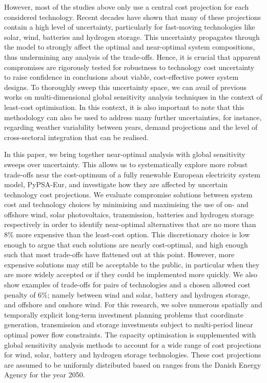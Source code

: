 However, most of the studies above only use a central cost projection for each
considered technology. Recent decades have shown that many of these projections
contain a high level of uncertainty, particularly for fast-moving technologies
like solar, wind, batteries and hydrogen storage.
\cite{ludererImpactDeclining2021,victoriaSolarPhotovoltaics2021,jaxa-rozenSourcesUncertainty2021}
This uncertainty propagates through the model to strongly affect the optimal and
near-optimal system compositions, thus undermining any analysis of the
trade-offs. Hence, it is crucial that apparent compromises are rigorously tested
for robustness to technology cost uncertainty to raise confidence in conclusions
about viable, cost-effective power system designs. To thoroughly sweep this
uncertainty space, we can avail of previous works on multi-dimensional global
sensitivity analysis techniques in the context of least-cost
optimisation.\cite{trondle_trade-offs_2020, mavromatidis_uncertainty_2018,
pizarro-alonso_uncertainties_2019, fais_impact_2016, usher_value_2015} In this
context, it is also important to note that this methodology can also be used to
address many further uncertainties, for instance, regarding weather variability
between years, demand projections and the level of cross-sectoral integration
that can be realised.


In this paper, we bring together near-optimal analysis with global sensitivity
sweeps over uncertainty. This allows us to systematically explore more robust
trade-offs near the cost-optimum of a fully renewable European electricity
system model, PyPSA-Eur,\cite{pypsaeur} and investigate how they are affected by
uncertain technology cost projections. We evaluate compromise solutions between
system cost and technology choices by minimising and maximising the use of on-
and offshore wind, solar photovoltaics, transmission, batteries and hydrogen
storage respectively in order to identify near-optimal alternatives that are no
more than 8\% more expensive than the least-cost option. This discretionary
choice is low enough to argue that such solutions are nearly cost-optimal, and
high enough such that most trade-offs have flattened out at this point. However,
more expensive solutions may still be acceptable to the public, in particular
when they are more widely accepted or if they could be implemented more quickly.
We also show examples of trade-offs for pairs of technologies and a chosen
allowed cost penalty of 6\%; namely between wind and solar, battery and hydrogen
storage, and offshore and onshore wind. For this research, we solve numerous
spatially and temporally explicit long-term investment planning problems that
coordinate generation, transmission and storage investments subject to
multi-period linear optimal power flow constraints. The capacity optimisation is
supplemented with global sensitivity analysis methods to account for a wide
range of cost projections for wind, solar, battery and hydrogen storage
technologies. These cost projections are assumed to be uniformly distributed
based on ranges from the Danish Energy Agency for the year 2050.\cite{DEA}

